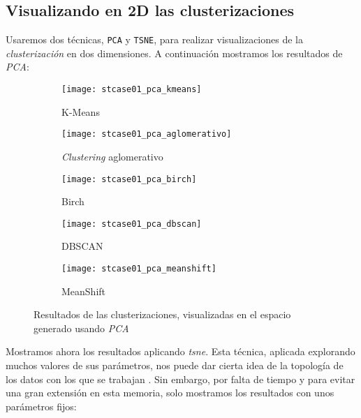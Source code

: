 \documentclass[11pt]{article}
\begin{document}
\pagebreak

\subsection{Visualizando en 2D las clusterizaciones}

Usaremos dos técnicas, \lstinline{PCA} y \lstinline{TSNE}, para realizar visualizaciones de la \emph{clusterización} en dos dimensiones. A continuación mostramos los resultados de \emph{PCA}:

\begin{figure}[H]
    \centering

    \begin{subfigure}[b]{0.45 \textwidth}
        \texttt{[image: stcase01\_pca\_kmeans]}
        \caption{K-Means}
    \end{subfigure}
    \begin{subfigure}[b]{0.45 \textwidth}
        \texttt{[image: stcase01\_pca\_aglomerativo]}
        \caption{\emph{Clustering} aglomerativo}
    \end{subfigure}

    \begin{subfigure}[b]{0.45 \textwidth}
        \texttt{[image: stcase01\_pca\_birch]}
        \caption{Birch}
    \end{subfigure}
    \begin{subfigure}[b]{0.45 \textwidth}
        \texttt{[image: stcase01\_pca\_dbscan]}
        \caption{DBSCAN}
    \end{subfigure}

    \begin{subfigure}[b]{0.45 \textwidth}
        \texttt{[image: stcase01\_pca\_meanshift]}
        \caption{MeanShift}
    \end{subfigure}

        \caption{Resultados de las clusterizaciones, visualizadas en el espacio generado usando \emph{PCA}}
\end{figure}

Mostramos ahora los resultados aplicando \emph{tsne}. Esta técnica, aplicada explorando muchos valores de sus parámetros, nos puede dar cierta idea de la topología de los datos con los que se trabajan \cite{tsne:online}. Sin embargo, por falta de tiempo y para evitar una gran extensión en esta memoria, solo mostramos los resultados con unos parámetros fijos:
\end{document}
